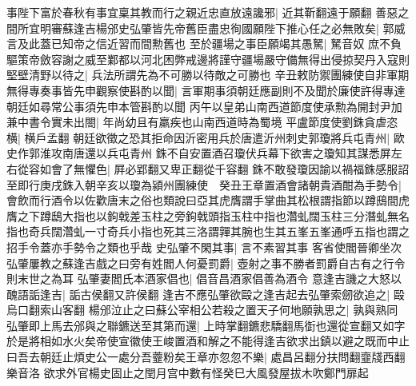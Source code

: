 事陛下富於春秋有事宜稟其教而行之親近忠直放遠讒邪|{
	近其靳翻遠于願翻}
善惡之間所宜明審蘇逢吉楊邠史弘肇皆先帝舊臣盡忠徇國願陛下推心任之必無敗矣|{
	郭威言及此蓋已知帝之信近習而間勲舊也}
至於疆場之事臣願竭其愚駑|{
	駑音奴}
庶不負驅策帝斂容謝之威至鄴都以河北困弊戒邊將謹守疆場嚴守備無得出侵掠契丹入寇則堅壁清野以待之|{
	兵法所謂先為不可勝以待敵之可勝也}
辛丑敕防禦團練使自非軍期無得專奏事皆先申觀察使斟酌以聞|{
	言軍期事須朝廷應副則不及聞於廉使許得專達朝廷如尋常公事須先申本管斟酌以聞}
丙午以皇弟山南西道節度使承勲為開封尹加兼中書令實未出閤|{
	年尚幼且有羸疾也山南西道時為蜀境}
平盧節度使劉銖貪虐恣横|{
	横戶孟翻}
朝廷欲徵之恐其拒命因沂密用兵於唐遣沂州刺史郭瓊將兵屯青州|{
	歐史作郭淮攻南唐還以兵屯青州}
銖不自安置酒召瓊伏兵幕下欲害之瓊知其謀悉屏左右從容如會了無懼色|{
	屛必郢翻又卑正翻從千容翻}
銖不敢發瓊因諭以禍福銖感服詔至即行庚戌銖入朝辛亥以瓊為潁州團練使　癸丑王章置酒會諸朝貴酒酣為手勢令|{
	會飲而行酒令以佐歡唐末之俗也類說曰亞其虎膺謂手掌曲其松根謂指節以蹲䲭間虎膺之下蹲鴟大指也以鉤戟差玉柱之旁鉤戟頭指玉柱中指也濳虬闊玉柱三分潛虬無名指也奇兵闊濳虬一寸奇兵小指也死其三洛謂嚲其腕也生其五峯五峯通呼五指也謂之招手令蓋亦手勢令之類也乎哉}
史弘肇不閑其事|{
	言不素習其事}
客省使閻晉卿坐次弘肇屢教之蘇逢吉戲之曰旁有姓閻人何憂罰爵|{
	壺射之事不勝者罰爵自古有之行令則末世之為耳}
弘肇妻閻氏本酒家倡也|{
	倡音昌酒家倡善為酒令}
意逢吉譏之大怒以醜語詬逢吉|{
	詬古侯翻又許侯翻}
逢吉不應弘肇欲毆之逢吉起去弘肇索劒欲追之|{
	毆烏口翻索山客翻}
楊邠泣止之曰蘇公宰相公若殺之置天子何地願孰思之|{
	孰與熟同}
弘肇即上馬去邠與之聯鑣送至其第而還|{
	上時掌翻鑣悲驕翻馬衘也還從宣翻又如字}
於是將相如水火矣帝使宣徽使王峻置酒和解之不能得逢吉欲求出鎮以避之既而中止曰吾去朝廷止煩史公一處分吾虀粉矣王章亦忽忽不樂|{
	處昌呂翻分扶問翻韲牋西翻樂音洛}
欲求外官楊史固止之閏月宫中數有怪癸巳大風發屋拔木吹鄭門扉起

